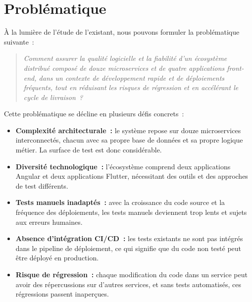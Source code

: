 \section{Problématique}
\label{sec:problematique}

À la lumière de l'étude de l'existant, nous pouvons formuler la problématique suivante~:

\begin{quote}
\textit{Comment assurer la qualité logicielle et la fiabilité d'un écosystème distribué composé de douze microservices et de quatre applications front-end, dans un contexte de développement rapide et de déploiements fréquents, tout en réduisant les risques de régression et en accélérant le cycle de livraison~?}
\end{quote}

Cette problématique se décline en plusieurs défis concrets~:

\begin{itemize}
    \item \textbf{Complexité architecturale~:} le système repose sur douze microservices interconnectés, chacun avec sa propre base de données et sa propre logique métier. La surface de test est donc considérable.
    \item \textbf{Diversité technologique~:} l'écosystème comprend deux applications Angular et deux applications Flutter, nécessitant des outils et des approches de test différents.
    \item \textbf{Tests manuels inadaptés~:} avec la croissance du code source et la fréquence des déploiements, les tests manuels deviennent trop lents et sujets aux erreurs humaines.
    \item \textbf{Absence d'intégration CI/CD~:} les tests existants ne sont pas intégrés dans le pipeline de déploiement, ce qui signifie que du code non testé peut être déployé en production.
    \item \textbf{Risque de régression~:} chaque modification du code dans un service peut avoir des répercussions sur d'autres services, et sans tests automatisés, ces régressions passent inaperçues.
\end{itemize}

